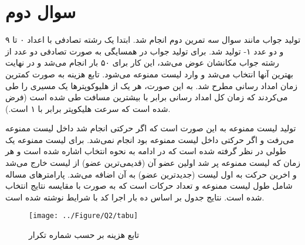 \section{سوال دوم}
تولید جواب مانند سوال سه تمرین دوم انجام شد. ابتدا یک رشته تصادفی با اعداد ۰ تا ۹ و دو عدد ۱- تولید شد. برای تولید جواب در همسایگی به صورت تصادفی دو عدد از رشته جواب مکانشان عوض می‌شد، این کار برای ۵۰ بار انجام می‌شد و در نهایت بهترین آنها انتخاب می‌شد و وارد لیست ممنوعه می‌شود. تابع هزینه به صورت کمترین زمان امداد رسانی مطرح شد. به این صورت، هر یک از هلیوکوپترها یک مسیری را طی می‌کردند که زمان کل امداد رسانی برابر با بیشترین مسافت طی شده است (فرض شده است که سرعت هلیکوپتر برابر با ۱ است.).

تولید لیست ممنوعه به این صورت است که اگر حرکتی انجام شد داخل لیست ممنوعه می‌رفت و اگر حرکتی داخل لیست ممنوعه بود انجام نمی‌شد. برای لیست ممنوعه یک طولی در نظر گرفته شده است که در ادامه به نحوه انتخاب اشاره شده است و هر زمان که لیست ممنوعه پر شد اولین عضو آن (قدیمی‌ترین عضو) از لیست خارج می‌شد و اخرین حرکت به اول لیست (جدیدترین عضو) به آن اضافه می‌شد. پارامترهای مساله شامل طول لیست ممنوعه و تعداد حرکات است که به صورت 
با مقایسه نتایج انتخاب شده است. نتایج جدول بر اساس ده بار اجرا کد با شرایط نوشته شده است.


\begin{figure}[H]
	\caption{تابع هزینه بر حسب شماره تکرار} 
	\centering 
	\texttt{[image: ../Figure/Q2/tabu]} 
\end{figure}
